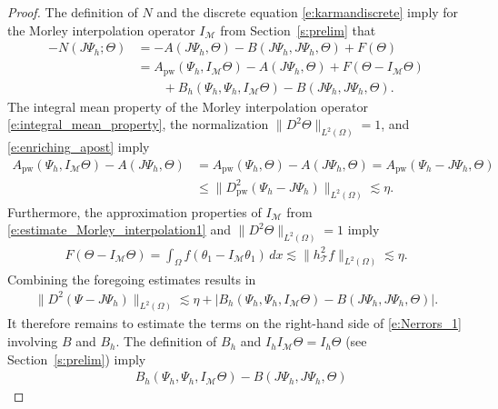 \documentclass[a4paper]{amsart}
\theoremstyle{definition}
\numberwithin{equation}{section}
\numberwithin{theorem}{section}
\newcommand{\pw}{\mathrm{pw}}
\newcommand{\tri}{\mathcal{T}}
\begin{document}
\begin{proof}
    The definition of $N$ and the 
    discrete equation \eqref{e:karmandiscrete} imply for the Morley interpolation
    operator $I_\mathcal{M}$ from Section~\ref{s:prelim} that
    \begin{align*}
        -N(J\Psi_h;\Theta) 
        &= -A(J\Psi_h,\Theta) - B(J\Psi_h,J\Psi_h,\Theta) +F(\Theta)\\
        &=  A_\pw(\Psi_h,I_\mathcal{M}\Theta) - A(J\Psi_h,\Theta)
            +F(\Theta-I_\mathcal{M}\Theta)\\
        &\qquad 
        + B_h(\Psi_h,\Psi_h,I_\mathcal{M}\Theta)- B(J\Psi_h,J\Psi_h,\Theta)
           .
    \end{align*}
    The integral mean property of the Morley interpolation 
    operator \eqref{e:integral_mean_property}, the normalization 
    $\lVert D^2\Theta\rVert_{L^2(\Omega)}=1$, and \eqref{e:enriching_apost} imply
    \begin{align*}
        A_\pw(\Psi_h,I_\mathcal{M}\Theta)-A(J\Psi_h,\Theta)
        &=  A_\pw(\Psi_h,\Theta) - A(J\Psi_h,\Theta)
        = A_\pw(\Psi_h-J\Psi_h,\Theta) \\
        &\leq \lVert D^2_\pw(\Psi_h-J\Psi_h)\rVert_{L^2(\Omega)}
        \lesssim \eta.
    \end{align*}
    Furthermore, the approximation properties of 
    $I_\mathcal{M}$ from \eqref{e:estimate_Morley_interpolation1}
    and $\lVert D^2\Theta\rVert_{L^2(\Omega)}=1$ imply 
    \begin{align*}
        F(\Theta -I_\mathcal{M}\Theta)
        = \int_\Omega f (\theta_1-I_\mathcal{M}\theta_1)\,dx
        \lesssim \lVert h_\tri^2 f\rVert_{L^2(\Omega)}
        \lesssim \eta.
    \end{align*}
    Combining the foregoing estimates results in
    \begin{align}\label{e:Nerrors_1}
          \lVert D^2(\Psi-J\Psi_h)\rVert_{L^2(\Omega)}
      \lesssim
       \eta 
        +
        \left |B_h(\Psi_h,\Psi_h,I_\mathcal{M}\Theta)- B(J\Psi_h,J\Psi_h,\Theta)
        \right|
           .
    \end{align}
    It therefore remains to estimate the terms on the right-hand side 
    of \eqref{e:Nerrors_1} involving $B$ and $B_h$.
    The definition of $B_h$ and 
    $I_h I_\mathcal{M}\Theta=I_h \Theta$ (see Section~\ref{s:prelim}) imply 
    \begin{equation}\label{e:vK_proof_reliability_1}
    \begin{aligned}
        &B_h(\Psi_h,\Psi_h,I_\mathcal{M}\Theta)
         - B(J\Psi_h,J\Psi_h,\Theta)

\end{aligned}
\end{equation}
\end{proof}
\end{document}
